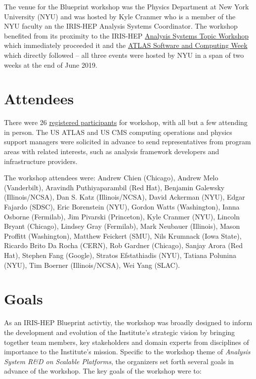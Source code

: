 \documentclass[11pt,letterpaper,fleqn]{article}
\begin{document}
The venue for the Blueprint workshop was the Physics Department at New York University (NYU) and was hosted by Kyle Cranmer who is a member of the NYU faculty an the IRIS-HEP Analysis Systems Coordinator. The workshop benefited from its proximity to the IRIS-HEP \href{https://indico.cern.ch/event/822074/}{Analysis Systems Topic Workshop} which immediately proceeded it and the \href{https://indico.cern.ch/event/765245/}{ATLAS Software and Computing Week} which directly followed -- all three events were hosted by NYU in a span of two weeks at the end of June 2019.

\section{Attendees}
\vspace{0.2cm}
There were 26 \href{https://indico.cern.ch/event/820946/registrations/participants}{registered participants} for workshop, with all but a few attending in person. The US ATLAS and US CMS computing operations and physics support managers were solicited in advance to send representatives from program areas with related interests, such as analysis framework developers and infrastructure providers.

The workshop attendees were:
Andrew Chien (Chicago),
Andrew Melo (Vanderbilt),
Aravindh Puthiyaparambil (Red Hat),
Benjamin Galewsky (Illinois/NCSA),
Dan S. Katz (Illinois/NCSA),
David Ackerman (NYU),
Edgar Fajardo (SDSC),
Eric Borenstein (NYU),
Gordon Watts (Washington),
Ianna Osborne (Fermilab),
Jim Pivarski (Princeton),
Kyle Cranmer (NYU),
Lincoln Bryant (Chicago),
Lindsey Gray (Fermilab),
Mark Neubauer (Illinois),
Mason Proffitt (Washington),
Matthew Feickert (SMU),
Nils Krumnack (Iowa State),
Ricardo Brito Da Rocha (CERN),
Rob Gardner (Chicago),
Sanjay Arora (Red Hat),
Stephen Fang (Google),
Stratos Efstathiadis (NYU),
Tatiana Polunina (NYU),
Tim Boerner (Illinois/NCSA),
Wei Yang (SLAC).

\section{Goals}
\label{sec:Goals}
\vspace{0.2cm}
As an IRIS-HEP Blueprint activtiy, the workshop was broadly designed to inform the development and evolution of the Institute’s strategic vision by bringing together team members, key stakeholders and domain experts from disciplines of importance to the Institute's mission. Specific to the workshop theme of \textit{Analysis System R\&D on Scalable Platforms}, the organizers set forth several goals in advance of the workshop. The key goals of the workshop were to:
\end{document}
